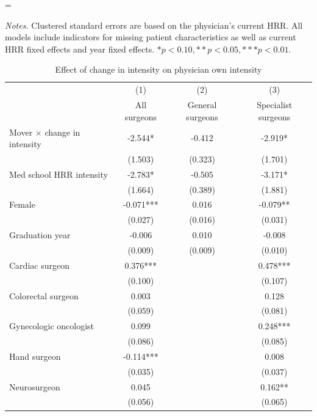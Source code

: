 \setlength{\LTpost}{0mm}
\LTcapwidth=\textwidth
\begin{ThreePartTable}
\begin{TableNotes}
    \textit{Notes.} Clustered standard errors are based on the physician's current HRR. All models include indicators for missing patient characteristics as well as current HRR fixed effects and year fixed effects. $* p < 0.10, ** p < 0.05, *** p < 0.01$.
\end{TableNotes}
\begin{longtable}{lccc}
    \label{tab:res-delta} \\
    \caption{Effect of change in intensity on physician own intensity} \\
        \toprule
         & (1) & (2) & (3) \\
         & All surgeons & General surgeons & Specialist surgeons \\
        \midrule
        Mover $\times$ change in intensity & -2.544* & -0.412 & -2.919* \\ 
         & (1.503) & (0.323) & (1.701) \\ 
        Med school HRR intensity & -2.783* & -0.505 & -3.171* \\ 
         & (1.664) & (0.389) & (1.881) \\ 
        Female & -0.071*** & 0.016 & -0.079** \\ 
         & (0.027) & (0.016) & (0.031) \\ 
        Graduation year & -0.006 & 0.010 & -0.008 \\ 
         & (0.009) & (0.009) & (0.010) \\ 
        Cardiac surgeon & 0.376*** &  & 0.478*** \\ 
         & (0.100) &  & (0.107) \\ 
        Colorectal surgeon & 0.003 &  & 0.128 \\ 
         & (0.059) &  & (0.081) \\ 
        Gynecologic oncologist & 0.099 &  & 0.248*** \\ 
         & (0.086) &  & (0.085) \\ 
        Hand surgeon & -0.114*** &  & 0.008 \\ 
         & (0.035) &  & (0.037) \\ 
        Neurosurgeon & 0.045 &  & 0.162** \\ 
         & (0.056) &  & (0.065) \\ 

\end{longtable}
\end{ThreePartTable}
